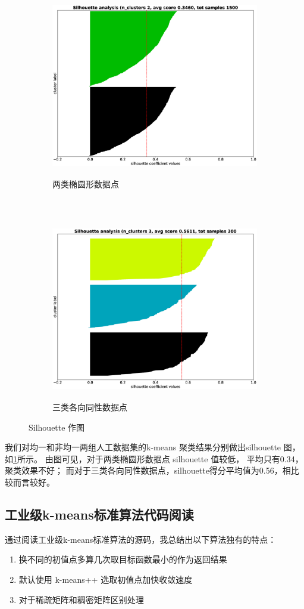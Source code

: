 \documentclass{ctexart}
\theoremstyle{definition}
\theoremstyle{remark}
\begin{document}
\begin{figure}[!ht]
    \centering
    \begin{subfigure}[b]{\textwidth}
    \includegraphics[height=8cm, width=\textwidth]{uneven_s.eps}
    \caption{两类椭圆形数据点}\label{fig:silhouette_uneven}
    \end{subfigure}\\
    \begin{subfigure}[b]{\textwidth}
    \includegraphics[height=8cm, width=\textwidth]{even_s.eps}
    \caption{三类各向同性数据点}\label{fig:silhouette_even}
    \end{subfigure}
     \caption{Silhouette 作图}\label{fig:silhouette}
\end{figure}

我们对均一和非均一两组人工数据集的k-means 聚类结果分别做出silhouette 图，如\ref{fig:silhouette_uneven}所示。 由图可见，对于两类椭圆形数据点 silhouette 值较低， 平均只有0.34，聚类效果不好；
而对于三类各向同性数据点，silhouette得分平均值为0.56，相比较而言较好。
\subsection{工业级k-means标准算法代码阅读}
通过阅读工业级k-means标准算法的源码\cite{kmeans-industry}，我总结出以下算法独有的特点：
\begin{enumerate}
\item 换不同的初值点多算几次取目标函数最小的作为返回结果
\item 默认使用 k-means++ 选取初值点加快收敛速度
\item 对于稀疏矩阵和稠密矩阵区别处理
\end{enumerate}
\end{document}
